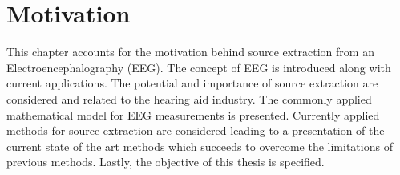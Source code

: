\chapter{Motivation}\label{ch:motivation}
This chapter accounts for the motivation behind source extraction from an Electroencephalography (EEG). The concept of EEG is introduced along with current applications. The potential and importance of source extraction are considered and related to the hearing aid industry. The commonly applied mathematical model for EEG measurements is presented. Currently applied methods for source extraction are considered leading to a presentation of the current state of the art methods which succeeds to overcome the limitations of previous methods. Lastly, the objective of this thesis is specified.          


